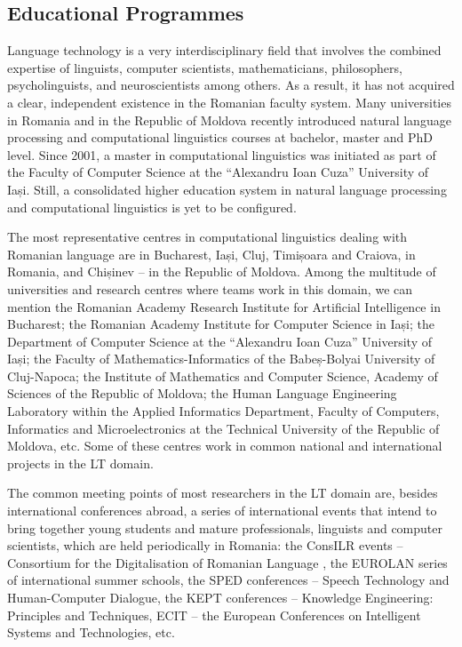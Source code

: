 \begin{multicols}{2}
\subsection{Educational Programmes}

Language technology is a very interdisciplinary field that involves the combined expertise of linguists, computer scientists, mathematicians, philosophers, psycholinguists, and neuroscientists among others. As a result, it has not acquired a clear, independent existence in the Romanian faculty system. Many universities in Romania and in the Republic of Moldova recently introduced natural language processing and computational linguistics courses at bachelor, master and PhD level. Since 2001, a master in computational linguistics was initiated as part of the Faculty of Computer Science at the “Alexandru Ioan Cuza” University of Iași. Still, a consolidated higher education system in natural language processing and computational linguistics is yet to be configured.

The most representative centres in computational linguistics dealing with Romanian language are in Bucharest, Iași, Cluj, Timișoara and Craiova, in Romania, and Chișinev – in the Republic of Moldova. Among the multitude of universities and research centres where teams work in this domain, we can mention the Romanian Academy Research Institute for Artificial Intelligence in Bucharest; the Romanian Academy Institute for Computer Science in Iași; the Department of Computer Science at the “Alexandru Ioan Cuza” University of Iași; the Faculty of Mathematics-Informatics of the Babeș-Bolyai University of Cluj-Napoca; the Institute of Mathematics and Computer Science, Academy of Sciences of the Republic of Moldova; the Human Language Engineering Laboratory within the Applied Informatics Department, Faculty of Computers, Informatics and Microelectronics at the Technical University of the Republic of Moldova, etc. Some of these centres work in common national and international projects in the LT domain. 

The common meeting points of most researchers in the LT domain are, besides international conferences abroad, a series of international events that intend to bring together young students and mature professionals, linguists and computer scientists, which are held periodically in Romania: the ConsILR events – Consortium for the Digitalisation of Romanian Language \cite{consilr}, the EUROLAN series of international summer schools, the SPED conferences – Speech Technology and Human-Computer Dialogue, the KEPT conferences -- Knowledge Engineering: Principles and Techniques, ECIT – the European Conferences on Intelligent Systems and Technologies, etc.


\end{multicols}
